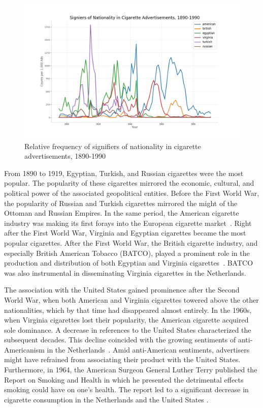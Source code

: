 \documentclass[USenglish]{article}
\begin{document}
\begin{figure}%
  \centering
  \includegraphics[width=.9\textwidth]{figures/cigarette_nationality}%
  \caption{Relative frequency of signifiers of nationality in cigarette advertisements, 1890-1990}%
  \label{fig:cig_nationality}%
\end{figure}
 

From 1890 to 1919, Egyptian, Turkish, and Russian cigarettes were the most popular. The popularity of these cigarettes mirrored the economic, cultural, and political power of the associated geopolitical entities. Before the First World War, the popularity of Russian and Turkish cigarettes mirrored the might of the Ottoman and Russian Empires. In the same period, the American cigarette industry was making its first forays into the European cigarette market~\cite{brandt_cigarette_2009}.
%
Right after the First World War, Virginia and Egyptian cigarettes became the most popular cigarettes. After the First World War, the British cigarette industry, and especially British American Tobacco (BATCO), played a prominent role in the production and distribution of both Egyptian and Virginia cigarettes~\cite[27-8]{shechter_smoking_2006}. BATCO was also instrumental in disseminating Virginia cigarettes in the Netherlands.

The association with the United States gained prominence after the Second World War, when both American and Virginia cigarettes towered above the other nationalities, which by that time had disappeared almost entirely. In the 1960s, when Virginia cigarettes lost their popularity, the American cigarette acquired sole dominance. A decrease in references to the United States characterized the subsequent decades.
%
This decline coincided with the growing sentiments of anti-Americanism in the Netherlands~\cite{kroes_european_2006,gienow-hecht_always_2006}. Amid anti-American sentiments, advertisers might have refrained from associating their product with the United States. Furthermore, in 1964, the American Surgeon General Luther Terry published the Report on Smoking and Health in which he presented the detrimental effects smoking could have on one’s health. The report led to a significant decrease in cigarette consumption in the Netherlands and the United States \cite{hoffmann_less_2001}.
\end{document}
